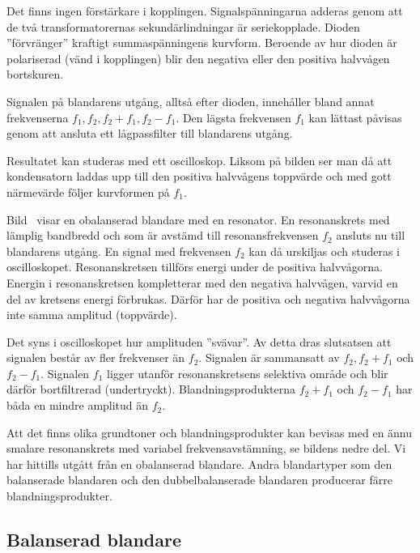 Det finns ingen förstärkare i kopplingen.
Signalspänningarna adderas genom att de två transformatorernas
sekundärlindningar är seriekopplade.
Dioden ''förvränger'' kraftigt summaspänningens kurvform.
Beroende av hur dioden är polariserad (vänd i kopplingen) blir den negativa
eller den positiva halvvågen bortskuren.

\newpage
Signalen på blandarens utgång, alltså efter dioden, innehåller
bland annat frekvenserna \(f_1, f_2, f_2+f_1, f_2-f_1\).
Den lägsta frekvensen \(f_1\) kan lättast påvisas genom att ansluta ett
lågpassfilter till blandarens utgång.

Resultatet kan studeras med ett oscilloskop.
Liksom på bilden ser man då att kondensatorn laddas upp till den positiva
halvvågens toppvärde och med gott närmevärde följer kurvformen på \(f_1\).

\newpage
{}

Bild~ visar en obalanserad blandare med en resonator.
En resonanskrets med lämplig bandbredd och som är avstämd till
resonansfrekvensen \(f_2\) ansluts nu till blandarens utgång.
En signal med frekvensen \(f_2\) kan då urskiljas och studeras i oscilloskopet.
Resonanskretsen tillförs energi under de positiva halvvågorna.
Energin i resonanskretsen kompletterar med den negativa halvvågen, varvid en
del av kretsens energi förbrukas.
Därför har de positiva och negativa halvvågorna inte samma amplitud (toppvärde).

\newpage
Det syns i oscilloskopet hur amplituden ''svävar''.
Av detta dras slutsatsen att signalen består av fler frekvenser än \(f_2\).
Signalen är sammansatt av \(f_2, f_2+f_1\) och \(f_2-f_1\).
Signalen \(f_1\) ligger utanför resonanskretsens selektiva område och blir
därför bortfiltrerad (undertryckt).
Blandningsprodukterna \(f_2 + f_1\) och \(f_2 - f_1\) har båda en mindre
amplitud än \(f_2\).

Att det finns olika grundtoner och blandningsprodukter kan bevisas med en ännu
smalare resonanskrets med variabel frekvensavstämning, se bildens nedre del.
Vi har hittills utgått från en obalanserad blandare.
Andra blandartyper som den balanserade blandaren och den dubbelbalanserade
blandaren producerar färre blandningsprodukter.

\newpage

\subsection{Balanserad blandare}

